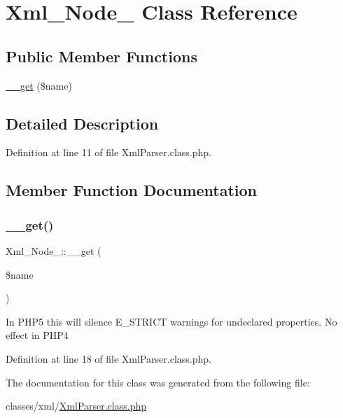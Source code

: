 \hypertarget{classXml__Node__}{}\section{Xml\+\_\+\+Node\+\_\+ Class Reference}
\label{classXml__Node__}
\subsection*{Public Member Functions}
\begin{DoxyCompactItemize}
\item 
\hyperlink{classXml__Node___a92b82fdfee7220d0438f98500ec10dc3}{\+\_\+\+\_\+get} (\$name)
\end{DoxyCompactItemize}


\subsection{Detailed Description}


Definition at line 11 of file Xml\+Parser.\+class.\+php.



\subsection{Member Function Documentation}
\hypertarget{classXml__Node___a92b82fdfee7220d0438f98500ec10dc3}{}\label{classXml__Node___a92b82fdfee7220d0438f98500ec10dc3} 
\subsubsection{\texorpdfstring{\+\_\+\+\_\+get()}{\_\_get()}}
{\footnotesize\ttfamily Xml\+\_\+\+Node\+\_\+\+::\+\_\+\+\_\+get (\begin{DoxyParamCaption}\item[{}]{\$name }\end{DoxyParamCaption})}

In P\+H\+P5 this will silence E\+\_\+\+S\+T\+R\+I\+CT warnings for undeclared properties. No effect in P\+H\+P4 

Definition at line 18 of file Xml\+Parser.\+class.\+php.



The documentation for this class was generated from the following file\+:\begin{DoxyCompactItemize}
\item 
classes/xml/\hyperlink{XmlParser_8class_8php}{Xml\+Parser.\+class.\+php}\end{DoxyCompactItemize}
